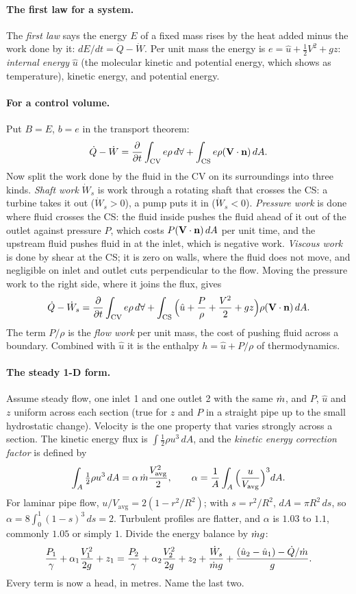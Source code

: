 \paragraph{The first law for a system.} The \emph{first law} says the energy $E$ of a fixed mass rises by the heat added minus the work done by it: $dE/dt = \dot Q - \dot W$. Per unit mass the energy is $e = \hat u + \tfrac12V^2 + gz$: \emph{internal energy} $\hat u$ (the molecular kinetic and potential energy, which shows as temperature), kinetic energy, and potential energy.

\paragraph{For a control volume.} Put $B = E$, $b = e$ in the transport theorem:
\[
\dot Q - \dot W = \frac{\partial }{\partial t}\int_\text{CV}e\rho\,d\forall + \int_\text{CS}e\rho(\mathbf{V}\cdot\mathbf{n})\,dA .
\]
Now split the work done by the fluid in the CV on its surroundings into three kinds. \emph{Shaft work} $\dot W_s$ is work through a rotating shaft that crosses the CS: a turbine takes it out ($\dot W_s > 0$), a pump puts it in ($\dot W_s < 0$). \emph{Pressure work} is done where fluid crosses the CS: the fluid inside pushes the fluid ahead of it out of the outlet against pressure $P$, which costs $P(\mathbf{V}\cdot\mathbf{n})\,dA$ per unit time, and the upstream fluid pushes fluid in at the inlet, which is negative work. \emph{Viscous work} is done by shear at the CS; it is zero on walls, where the fluid does not move, and negligible on inlet and outlet cuts perpendicular to the flow. Moving the pressure work to the right side, where it joins the flux, gives
\[
\dot Q - \dot W_s = \frac{\partial }{\partial t}\int_\text{CV}e\rho\,d\forall + \int_\text{CS}\Big(\hat u + \frac{P}{\rho} + \frac{V^2}{2} + gz\Big)\rho(\mathbf{V}\cdot\mathbf{n})\,dA .
\]
The term $P/\rho$ is the \emph{flow work} per unit mass, the cost of pushing fluid across a boundary. Combined with $\hat u$ it is the enthalpy $h = \hat u + P/\rho$ of thermodynamics.

\paragraph{The steady 1-D form.} Assume steady flow, one inlet 1 and one outlet 2 with the same $\dot m$, and $P$, $\hat u$ and $z$ uniform across each section (true for $z$ and $P$ in a straight pipe up to the small hydrostatic change). Velocity is the one property that varies strongly across a section. The kinetic energy flux is $\int\tfrac12\rho u^3\,dA$, and the \emph{kinetic energy correction factor} is defined by
\[
\int_A\tfrac12\rho u^3\,dA = \alpha\,\dot m\frac{V_\text{avg}^2}{2},\qquad \alpha = \frac1A\int_A\Big(\frac{u}{V_\text{avg}}\Big)^3dA .
\]
For laminar pipe flow, $u/V_\text{avg} = 2(1 - r^2/R^2)$; with $s = r^2/R^2$, $dA = \pi R^2\,ds$, so $\alpha = 8\int_0^1(1 - s)^3\,ds = 2$. Turbulent profiles are flatter, and $\alpha$ is $1.03$ to $1.1$, commonly $1.05$ or simply $1$. Divide the energy balance by $\dot m g$:
\[
\frac{P_1}{\gamma} + \alpha_1\frac{V_1^2}{2g} + z_1 = \frac{P_2}{\gamma} + \alpha_2\frac{V_2^2}{2g} + z_2 + \frac{\dot W_s}{\dot m g} + \frac{(\hat u_2 - \hat u_1) - \dot Q/\dot m}{g} .
\]
Every term is now a head, in metres. Name the last two.

